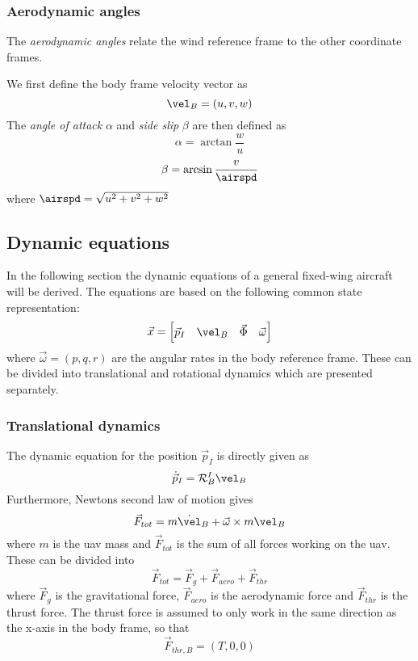 \subsubsection{Aerodynamic angles}
The \textit{aerodynamic angles} relate the wind reference frame to the other coordinate frames.

\begin{definition}
We first define the body frame velocity vector as 
\begin{equation}
    \vel_B=(u, v, w)
\end{equation}
The \textit{angle of attack} $\alpha$ and \textit{side slip} $\beta$ are then defined as
\begin{equation}
    \alpha=\arctan\frac{w}{u}
\end{equation}
\begin{equation}
    \beta=\arcsin\frac{v}{\airspd}
\end{equation}
where $\airspd=\sqrt{u^2+v^2+w^2}$
\end{definition}


\subsection{Dynamic equations}
In the following section the dynamic equations of a general fixed-wing aircraft will be derived. The 
equations are based on the following common state representation:
\begin{equation}
    \vec{x}=
    \begin{bmatrix}
        \vec{p}_I & \vel_B & \vec{\Phi} & \vec{\omega}
    \end{bmatrix}
\end{equation}
where $\vec{\omega}=(p, q, r)$ are the angular rates in the body reference frame. These can be divided
into translational and rotational dynamics which are presented separately.
\subsubsection{Translational dynamics}
The dynamic equation for the position $\vec{p}_I$ is directly given as
\begin{equation}\label{eq:dynamic_first}
    \dot{\vec{p}}_I=\mathcal{R}^I_B\vel_B
\end{equation}
Furthermore, Newtons second law of motion gives 
\begin{equation}\label{eq:uav_force}
    \vec{F}_{tot}=m\dot{\vel}_B + \vec{\omega}\times m\vel_B 
\end{equation}
where $m$ is the \ac{uav} mass and $\vec{F}_{tot}$ is the sum of all forces working on the \ac{uav}.
These can be divided into
\begin{equation}
    \vec{F}_{tot}=\vec{F}_g+\vec{F}_{aero}+\vec{F}_{thr}
\end{equation}
where $\vec{F}_g$ is the gravitational force, $\vec{F}_{aero}$ is the aerodynamic force and
$\vec{F}_{thr}$ is the thrust force. The thrust force is assumed to only work in the same direction
as the x-axis in the body frame, so that
\begin{equation}
    \vec{F}_{thr, B}=(T, 0, 0)
\end{equation}
